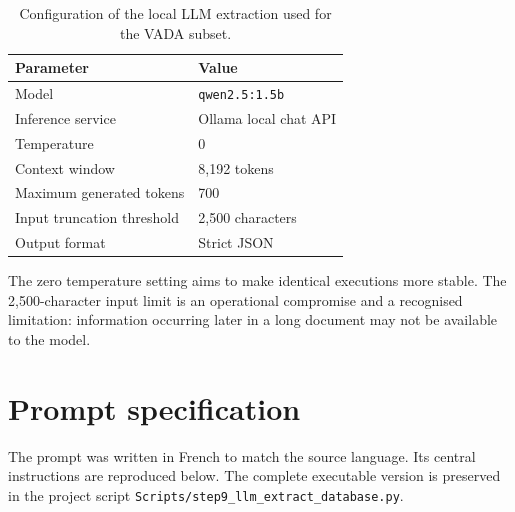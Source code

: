 \begin{table}[H]
\centering
\begin{tabular}{ll}
\toprule
Parameter & Value \\
\midrule
Model & \texttt{qwen2.5:1.5b} \\
Inference service & Ollama local chat API \\
Temperature & 0 \\
Context window & 8,192 tokens \\
Maximum generated tokens & 700 \\
Input truncation threshold & 2,500 characters \\
Output format & Strict JSON \\
\bottomrule
\end{tabular}
\caption{Configuration of the local LLM extraction used for the VADA subset.}
\label{tab:appendix-llm-configuration}
\end{table}

The zero temperature setting aims to make identical executions more stable.
The 2,500-character input limit is an operational compromise and a recognised
limitation: information occurring later in a long document may not be available
to the model.

\section{Prompt specification}

The prompt was written in French to match the source language. Its central
instructions are reproduced below. The complete executable version is preserved
in the project script \texttt{Scripts/step9\_llm\_extract\_database.py}.

